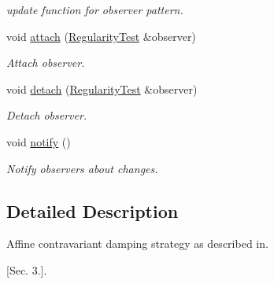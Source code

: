 \begin{DoxyCompactItemize}
\begin{DoxyCompactList}\small\item\em update function for observer pattern. \end{DoxyCompactList}\item 
\hypertarget{classSpacy_1_1Mixin_1_1MixinConnection_abb5520ee6b22dd993d78f142939a1ed4}{void \hyperlink{classSpacy_1_1Mixin_1_1MixinConnection_abb5520ee6b22dd993d78f142939a1ed4}{attach} (\hyperlink{classSpacy_1_1Mixin_1_1RegularityTest_a548d9d45c31c7833266bd3b20dc1aa7e}{\-Regularity\-Test} \&observer)}\label{classSpacy_1_1Mixin_1_1MixinConnection_abb5520ee6b22dd993d78f142939a1ed4}

\begin{DoxyCompactList}\small\item\em \-Attach observer. \end{DoxyCompactList}\item 
\hypertarget{classSpacy_1_1Mixin_1_1MixinConnection_adda739590c487679c26f60e50aedb73f}{void \hyperlink{classSpacy_1_1Mixin_1_1MixinConnection_adda739590c487679c26f60e50aedb73f}{detach} (\hyperlink{classSpacy_1_1Mixin_1_1RegularityTest_a548d9d45c31c7833266bd3b20dc1aa7e}{\-Regularity\-Test} \&observer)}\label{classSpacy_1_1Mixin_1_1MixinConnection_adda739590c487679c26f60e50aedb73f}

\begin{DoxyCompactList}\small\item\em \-Detach observer. \end{DoxyCompactList}\item 
\hypertarget{classSpacy_1_1Mixin_1_1MixinConnection_a1ddeaa78a3bb4a38c2cca36d1f99fe36}{void \hyperlink{classSpacy_1_1Mixin_1_1MixinConnection_a1ddeaa78a3bb4a38c2cca36d1f99fe36}{notify} ()}\label{classSpacy_1_1Mixin_1_1MixinConnection_a1ddeaa78a3bb4a38c2cca36d1f99fe36}

\begin{DoxyCompactList}\small\item\em \-Notify observers about changes. \end{DoxyCompactList}\end{DoxyCompactItemize}


\subsection{\-Detailed \-Description}
\-Affine contravariant damping strategy as described in. 

\cite{Deuflhard2004} \mbox{[}\-Sec. 3.\mbox{]}. 

